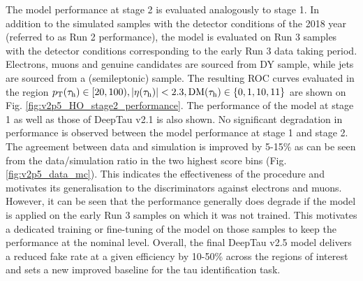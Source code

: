 The model performance at stage 2 is evaluated analogously to stage 1. In addition to the simulated samples with the detector conditions of the 2018 year (referred to as Run 2 performance), the model is evaluated on Run 3 samples with the detector conditions corresponding to the early Run 3 data taking period. Electrons, muons and genuine \tauh candidates are sourced from DY sample, while jets are sourced from a \ttbar (semileptonic) sample. The resulting ROC curves evaluated in the region $p_\text{T}(\tau_\mathrm{h}) \in [20,100), |\eta(\tau_\mathrm{h})| < 2.3, \text{DM}(\tau_\mathrm{h}) \in \{0,1,10,11\}$ are shown on Fig. \ref{fig:v2p5_HO_stage2_performance}. The performance of the model at stage 1 as well as those of DeepTau v2.1 is also shown. No significant degradation in performance is observed between the model performance at stage 1 and stage 2. The agreement between data and simulation is improved by 5-15\% as can be seen from the data/simulation ratio in the two highest score bins (Fig. \ref{fig:v2p5_data_mc}). This indicates the effectiveness of the procedure and motivates its generalisation to the discriminators against electrons and muons. However, it can be seen that the performance generally does degrade if the model is applied on the early Run 3 samples on which it was not trained. This motivates a dedicated training or fine-tuning of the model on those samples to keep the performance at the nominal level. Overall, the final DeepTau v2.5 model delivers a reduced fake rate at a given \tauh efficiency by 10-50\% across the regions of interest and sets a new improved baseline for the tau identification task.

